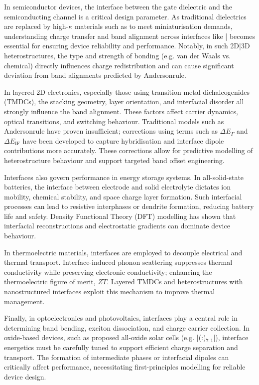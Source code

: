 In semiconductor devices, the interface between the gate dielectric and the semiconducting channel is a critical
design parameter. As traditional  dielectrics are replaced by high-$\kappa$ materials such as  to
meet miniaturisation demands, understanding charge transfer and band alignment across interfaces like |
 becomes essential for ensuring device reliability and performance. Notably, in such 2D|3D
heterostructures, the type and strength of bonding (e.g. van der Waals vs. chemical) directly influences charge
redistribution and can cause significant deviation from band alignments predicted by Anderson\rqs rule.

In layered 2D electronics, especially those using transition metal dichalcogenides (TMDCs), the stacking geometry,
layer orientation, and interfacial disorder all strongly influence the band alignment. These factors affect carrier
dynamics, optical transitions, and switching behaviour. Traditional models such as Anderson\rqss rule have proven
insufficient; corrections using terms such as $\Delta E_\Gamma$ and $\Delta E_{\text{IF}}$ have been developed to
capture hybridisation and interface dipole contributions more accurately. These corrections allow for predictive
modelling of heterostructure behaviour and support targeted band offset engineering.

Interfaces also govern performance in energy storage systems. In all-solid-state batteries, the interface between
electrode and solid electrolyte dictates ion mobility, chemical stability, and space charge layer formation. Such
interfacial processes can lead to resistive interphases or dendrite formation, reducing battery life and safety.
Density Functional Theory (DFT) modelling has shown that interfacial reconstructions and electrostatic gradients can
dominate device behaviour.

In thermoelectric materials, interfaces are employed to decouple electrical and thermal transport. Interface-induced
phonon scattering suppresses thermal conductivity while preserving electronic conductivity; enhancing the
thermoelectric figure of merit, $ZT$. Layered TMDCs and heterostructures with nanostructured interfaces exploit this
mechanism to improve thermal management.

Finally, in optoelectronics and photovoltaics, interfaces play a central role in determining band bending, exciton
dissociation, and charge carrier collection. In oxide-based devices, such as proposed all-oxide solar cells (e.g.
|(:)$_{7:1}$|), interface energetics must be carefully tuned to support efficient
charge separation and transport. The formation of intermediate phases or interfacial dipoles can critically affect
performance, necessitating first-principles modelling for reliable device design.

